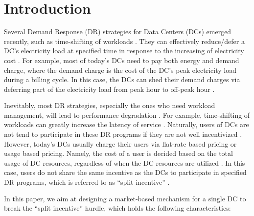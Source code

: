 \documentclass[conference]{IEEEtran}
\begin{document}
\vspace{0.2cm}

\section{Introduction}\label{sec:introduction}
Several Demand Response (DR) strategies for Data Centers (DCs) emerged recently, such as time-shifting of workloads  \cite{Ghatikar2014}. They can effectively reduce/defer a DC's electricity load at specified time in response to the increasing of electricity cost \cite{Wierman2014}. For example, most of today's DCs need to pay both energy and demand charge, where the demand charge is the cost of the DC's peak electricity load during a billing cycle. In this case, the DCs can shed their demand charges via deferring part of the electricity load  from peak hour to off-peak hour \cite{Mathew2014}.

Inevitably, most DR strategies, especially the ones who need workload management, will lead to performance degradation \cite{Liu2014}. For example, time-shifting of workloads can greatly increase the latency of service \cite{Wang2014}. Naturally, users of DCs are not tend to participate in these DR programs if they are not well incentivized \cite{Zhan2015}. However, today's DCs usually charge their users via flat-rate based pricing or usage based pricing. Namely, the cost of a user is decided based on the total usage of DC resources, regardless of when the DC resources are utilized \cite{Li2010}. In this case, users do not share the same incentive as the DCs to participate in specified DR programs, which is referred to as ``split incentive'' \cite{Zhan2016}.



In this paper, we aim at designing a market-based mechanism for a single DC to break the ``split incentive'' hurdle, which holds the following characteristics:
\end{document}
